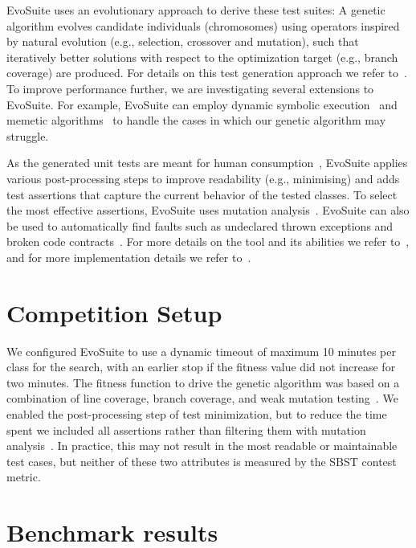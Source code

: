 \documentclass[10pt,conference,compsocconf]{IEEEtran}
\newcommand{\EVOSUITE}{{\sc EvoSuite}\xspace}
\begin{document}
\EVOSUITE uses an evolutionary approach to derive these test suites: A
genetic algorithm evolves candidate individuals (chromosomes) using
operators inspired by natural evolution (e.g., selection, crossover
and mutation), such that iteratively better solutions with respect to
the optimization target (e.g., branch coverage) are produced.  For
details on this test generation approach we refer to~\cite{GoA_TSE12}.
To improve performance further, we are investigating several
extensions to \EVOSUITE. 
For example, \EVOSUITE can employ dynamic
symbolic execution~\cite{evoISSRE113} 
and memetic algorithms~\cite{fraser2014memetic}
to handle the cases in which our genetic algorithm may struggle. 


As the generated unit tests are meant for human
consumption~\cite{fraser2013does}, \EVOSUITE applies various
post-processing steps to improve readability (e.g., minimising) and
adds test assertions that capture the current behavior of the tested
classes. To select the most effective assertions, \EVOSUITE uses
mutation analysis~\cite{10.1109/TSE.2011.93}.  \EVOSUITE can also be
used to automatically find faults such as undeclared thrown exceptions
and broken code contracts~\cite{emse13_oracle}.  For more details on
the tool and its abilities we refer to~\cite{FrA11c}, and for more
implementation details we refer to~\cite{FrA13a}.

\section{Competition Setup}

We configured \EVOSUITE to use a dynamic timeout of maximum 10 minutes
per class for the search, with an earlier stop if the fitness value
did not increase for two minutes. The fitness function to drive the
genetic algorithm was based on a combination of line coverage, branch
coverage, and weak mutation testing~\cite{emse14_mutation}. We enabled
the post-processing step of test minimization, but to reduce the time
spent we included all assertions rather than filtering them with
mutation analysis~\cite{10.1109/TSE.2011.93}. In practice, this may
not result in the most readable or maintainable test cases, but
neither of these two attributes is measured by the SBST contest
metric.

\section{Benchmark results}
\end{document}
